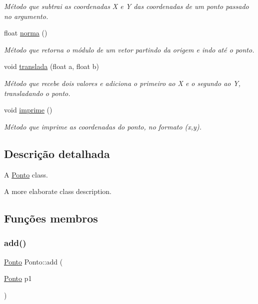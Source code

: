 \begin{DoxyCompactItemize}
\begin{DoxyCompactList}\small\item\em Método que subtrai as coordenadas X e Y das coordenadas de um ponto passado no argumento. \end{DoxyCompactList}\item 
float \mbox{\hyperlink{classPonto_a9b0ddbdddd05edbc4d45ef0671a628c6}{norma}} ()
\begin{DoxyCompactList}\small\item\em Método que retorna o módulo de um vetor partindo da origem e indo até o ponto. \end{DoxyCompactList}\item 
void \mbox{\hyperlink{classPonto_a96a4395204ec010814e67d20705e630f}{translada}} (float a, float b)
\begin{DoxyCompactList}\small\item\em Método que recebe dois valores e adiciona o primeiro ao X e o segundo ao Y, transladando o ponto. \end{DoxyCompactList}\item 
\mbox{\label{classPonto_a84758d453e38f237bdf860b6435e9def}} 
void \mbox{\hyperlink{classPonto_a84758d453e38f237bdf860b6435e9def}{imprime}} ()
\begin{DoxyCompactList}\small\item\em Método que imprime as coordenadas do ponto, no formato (x,y). \end{DoxyCompactList}\end{DoxyCompactItemize}


\subsection{Descrição detalhada}
A \mbox{\hyperlink{classPonto}{Ponto}} class. 

A more elaborate class description. 

\subsection{Funções membros}
\mbox{\label{classPonto_abb68d6122278de262e8ed1c70714e3d9}} 
\subsubsection{\texorpdfstring{add()}{add()}}
{\footnotesize\ttfamily \mbox{\hyperlink{classPonto}{Ponto}} Ponto\+::add (\begin{DoxyParamCaption}\item[{\mbox{\hyperlink{classPonto}{Ponto}}}]{p1 }\end{DoxyParamCaption})\hspace{0.3cm}{\ttfamily [inline]}}



